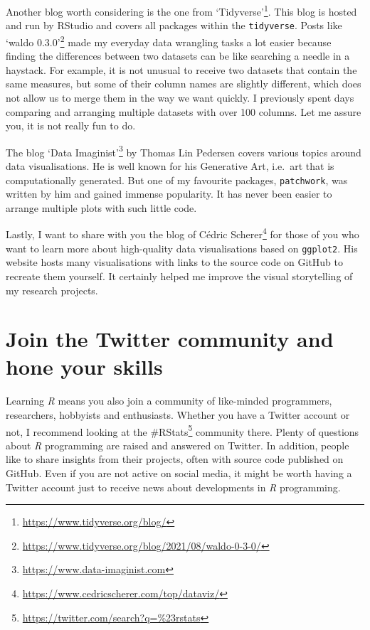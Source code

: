 \documentclass[
  letterpaper,
]{krantz}
\renewcommand{\href}[2]{#2\footnote{\url{#1}}}
\begin{document}
Another blog worth considering is the one from
\href{https://www.tidyverse.org/blog/}{`Tidyverse'}. This blog is hosted
and run by RStudio and covers all packages within the
\texttt{tidyverse}. Posts like
\href{https://www.tidyverse.org/blog/2021/08/waldo-0-3-0/}{`waldo
0.3.0'} made my everyday data wrangling tasks a lot easier because
finding the differences between two datasets can be like searching a
needle in a haystack. For example, it is not unusual to receive two
datasets that contain the same measures, but some of their column names
are slightly different, which does not allow us to merge them in the way
we want quickly. I previously spent days comparing and arranging
multiple datasets with over 100 columns. Let me assure you, it is not
really fun to do.

The blog \href{https://www.data-imaginist.com}{`Data Imaginist'} by
Thomas Lin Pedersen covers various topics around data visualisations. He
is well known for his Generative Art, i.e.~art that is computationally
generated. But one of my favourite packages, \texttt{patchwork}, was
written by him and gained immense popularity. It has never been easier
to arrange multiple plots with such little code.

Lastly, I want to share with you the
\href{https://www.cedricscherer.com/top/dataviz/}{blog of Cédric
Scherer} for those of you who want to learn more about high-quality data
visualisations based on \texttt{ggplot2}. His website hosts many
visualisations with links to the source code on GitHub to recreate them
yourself. It certainly helped me improve the visual storytelling of my
research projects.

\section{Join the Twitter community and hone your
skills}\label{next-steps-twitter}

Learning \emph{R} means you also join a community of like-minded
programmers, researchers, hobbyists and enthusiasts. Whether you have a
Twitter account or not, I recommend looking at the
\href{https://twitter.com/search?q=\%23rstats}{\#RStats} community
there. Plenty of questions about \emph{R} programming are raised and
answered on Twitter. In addition, people like to share insights from
their projects, often with source code published on GitHub. Even if you
are not active on social media, it might be worth having a Twitter
account just to receive news about developments in \emph{R} programming.
\end{document}
